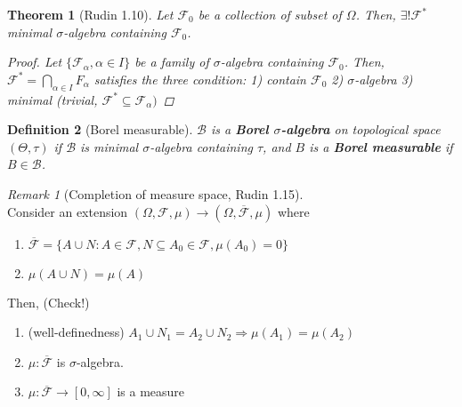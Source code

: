 \documentclass[12pt]{report}
\renewcommand{\subset}{\subseteq}
\theoremstyle{break}
\newtheorem{thm}{Theorem}[section] %
\theoremstyle{newdef}
\newtheorem{defn}[thm]{Definition} %
\theoremstyle{remark}
\newtheorem*{rem}{Remark} %
\begin{document}
\begin{thm}[Rudin 1.10]
Let $\mathcal{F}_0$ be a collection of subset of $\Omega$.
Then, $\exists! \mathcal{F}^*$ minimal $\sigma$-algebra containing $\mathcal F_0$.

\begin{proof}
Let $\{\mathcal{F}_\alpha, \alpha \in I\}$ be a family of $\sigma$-algebra containing $\mathcal{F}_0$.
Then, $\mathcal{F}^* = \bigcap_{\alpha\in I} F_\alpha$ satisfies the three condition:
1) contain $\mathcal{F}_0$
2) $\sigma$-algebra
3) minimal (trivial, $\mathcal{F}^* \subset \mathcal{F}_\alpha)$
\end{proof}
\end{thm}


\begin{defn}[Borel measurable]
$\mathcal{B}$ is a \textbf{Borel $\sigma$-algebra} on topological space $(\Theta,\tau)$ if
$\mathcal{B}$ is minimal $\sigma$-algebra containing $\tau$, and $B$ is a \textbf{Borel measurable} if $B \in \mathcal{B}$.
\end{defn}

\begin{rem}[Completion of measure space, Rudin 1.15]
\leavevmode\\
Consider an extension $(\Omega, \mathcal{F}, \mu) \rightarrow (\Omega, \overline{\mathcal{F}}, \mu)$ where
\begin{enumerate}
\item $\overline{\mathcal{F}} = \{ A \cup N : A \in \mathcal{F}, N \subset A_0 \in \mathcal{F}, \mu(A_0) = 0 \}$
\item $\mu(A \cup N) = \mu(A)$
\end{enumerate}
Then, (Check!)
\begin{enumerate}
\item (well-definedness) $A_1 \cup N_1 = A_2 \cup N_2 \Rightarrow \mu(A_1) = \mu(A_2)$
\item $\mu: \overline{\mathcal{F}}$ is $\sigma$-algebra.
\item $\mu : \overline{\mathcal{F}} \rightarrow [0,\infty]$ is a measure
\end{enumerate}
\end{rem}
\end{document}
